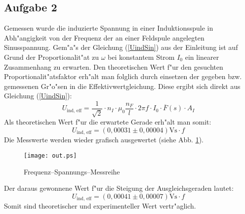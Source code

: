 \documentclass[a4paper,10pt]{article}
\begin{document}
\subsection{Aufgabe 2}
Gemessen wurde die induzierte Spannung in einer Induktionsspule in Abh"angigkeit von der Frequenz der an einer Feldspule angelegten Sinusspannung. Gem"a"s der Gleichung (\ref{UindSin}) aus der Einleitung ist auf Grund der Proportionalit"at zu $\omega$ bei konstantem Strom $I_0$ ein linearer Zusammenhang zu erwarten. Den theoretischen Wert f"ur den gesuchten Proportionalit"atsfaktor erh"alt man folglich durch einsetzen der gegeben bzw. gemessenen Gr"o"sen in die Effektivwertgleichung. Diese ergibt sich direkt aus Gleichung (\ref{UindSin}):
\begin{equation}
U_{\text{ind, eff}} = \frac{1}{\sqrt{2}} \cdot n_I \cdot \mu_0 \frac{n_F}{l} \cdot 2 \pi f \cdot I_0  \cdot \overline{F}(s)  \cdot A_I
\end{equation}
Als theoretischen Wert f"ur die erwartete Gerade erh"alt man somit:
\begin{equation}
U_{\text{ind, eff}} = (0,00031 \pm 0,00004) \text{V} \text{s} \cdot f
\end{equation}
Die Messwerte werden wieder grafisch ausgewertet (siehe Abb. \ref{fig:2}). 
\begin{figure}[htb]
	\centering
	     \texttt{[image: out.ps]}
	     \caption{Frequenz--Spannungs--Messreihe}
       \label{fig:2}
\end{figure}
Der daraus gewonnene Wert f"ur die Steigung der Ausgleichsgeraden lautet:
\begin{equation}
U_{\text{ind, eff}} = (0,00041 \pm 0,00007) \text{V} \text{s} \cdot f
\end{equation}
Somit sind theoretischer und experimenteller Wert vertr"aglich.
\newpage
\end{document}
